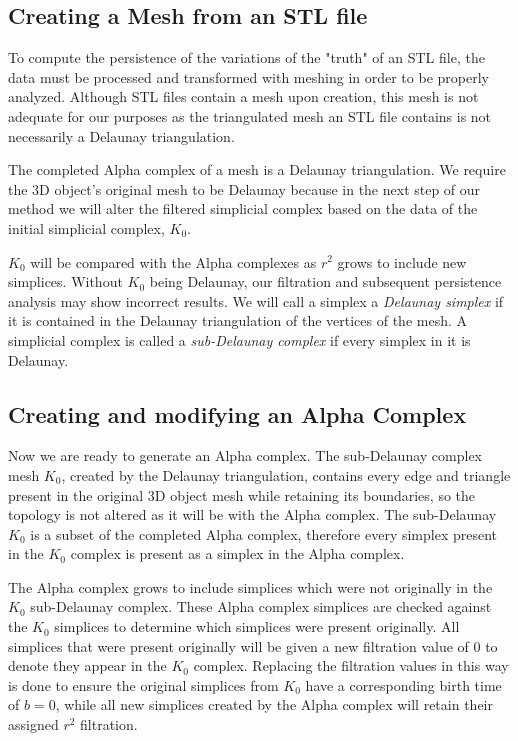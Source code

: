 \documentclass[ma]{uncgdissertationexp}
\theoremstyle{plain}
\theoremstyle{definition}
\theoremstyle{remark}
\begin{document}
\subsection{Creating a Mesh from an STL file}
\label{sec:mesh_from_stl}
\par To compute the persistence of the variations of the "truth" of an STL file, the data must be processed and transformed with meshing in order to be properly analyzed. Although STL files contain a mesh upon creation, this mesh is not adequate for our purposes as the triangulated mesh an STL file contains is not necessarily a Delaunay triangulation.
\par The completed Alpha complex of a mesh is a Delaunay triangulation. We require the 3D object's original mesh to be Delaunay because in the next step of our method we will alter the filtered simplicial complex based on the data of the initial simplicial complex, $K_{0}$.
\par $K_{0}$ will be compared with the Alpha complexes as $r^2$ grows to include new simplices. Without $K_0$ being Delaunay, our filtration and subsequent persistence analysis may show incorrect results. We will call a simplex a \textit{Delaunay simplex} if it is contained in the Delaunay triangulation of the vertices of the mesh. A simplicial complex is called a \textit{sub-Delaunay complex} if every simplex in it is Delaunay.
\subsection{Creating and modifying an Alpha Complex}
\label{sec:modify_alpha_complex}
\par Now we are ready to generate an Alpha complex. The sub-Delaunay complex mesh $K_{0}$, created by the Delaunay triangulation, contains every edge and triangle present in the original 3D object mesh while retaining its boundaries, so the topology is not altered as it will be with the Alpha complex. The sub-Delaunay $K_{0}$ is a subset of the completed Alpha complex, therefore every simplex present in the $K_{0}$ complex is present as a simplex in the Alpha complex.
\par The Alpha complex grows to include simplices which were not originally in the $K_{0}$ sub-Delaunay complex. These Alpha complex simplices are checked against the $K_{0}$ simplices to determine which simplices were present originally. All simplices that were present originally will be given a new filtration value of 0 to denote they appear in the $K_{0}$ complex. Replacing the filtration values in this way is done to ensure the original simplices from $K_{0}$ have a corresponding birth time of $b=0$, while all new simplices created by the Alpha complex will retain their assigned $r^{2}$ filtration.
\end{document}
